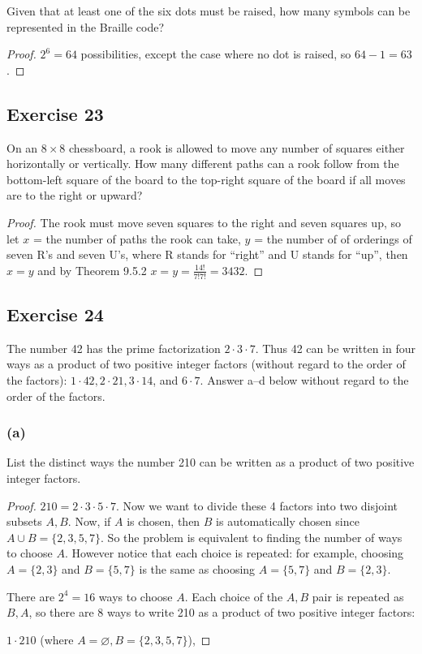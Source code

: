 \documentclass[14pt]{extarticle}
\newcommand{\es}{\varnothing}
\begin{document}
Given that at least one of the six dots must be raised, how many symbols can be represented in the Braille code?

\begin{proof}
\(2^6 = 64\) possibilities, except the case where no dot is raised, so \(64-1=63\).
\end{proof}

\subsection{Exercise 23}
On an \(8 \times 8\) chessboard, a rook is allowed to move any number of squares either horizontally or vertically. 
How many different paths can a rook follow from the bottom-left square of the board to the top-right square of the 
board if all moves are to the right or upward?

\begin{proof}
The rook must move seven squares to the right and seven squares up, so let \(x\) = the number of paths the rook can 
take, \(y\) =  the number of of orderings of seven R’s and seven U’s, where R stands for “right” and U stands for “up”,
then \(x = y\) and by Theorem 9.5.2 \(x = y = \frac{14!}{7!7!} = 3432\).
\end{proof}

\subsection{Exercise 24}
The number 42 has the prime factorization \(2 \cdot 3 \cdot 7\). Thus 42 can be written in four ways as a product of 
two positive integer factors (without regard to the order of the factors): \(1 \cdot 42, 2 \cdot 21, 3 \cdot 14\), 
and \(6 \cdot 7\). Answer a–d below without regard to the order of the factors.

\subsubsection{(a)}
List the distinct ways the number 210 can be written as a product of two positive integer factors.

\begin{proof}
\(210 = 2 \cdot 3 \cdot 5 \cdot 7\). Now we want to divide these 4 factors into two disjoint subsets \(A, B\). Now, if 
\(A\) is chosen, then \(B\) is automatically chosen since \(A \cup B = \{2,3,5,7\}\). So the problem is equivalent to 
finding the number of ways to choose \(A\). However notice that each choice is repeated: for example, choosing \(A = \{ 
2,3\}\) and \(B = \{5,7\}\) is the same as choosing \(A = \{ 5,7\}\) and \(B = \{2,3\}\).

There are \(2^4 = 16\) ways to choose \(A\). Each choice of the \(A,B\) pair is repeated as \(B,A\), so there are 8 ways
to write 210 as a product of two positive integer factors: 

\(1 \cdot 210\) (where \(A = \es, B = \{2,3,5,7\}\)),
\end{proof}
\end{document}
